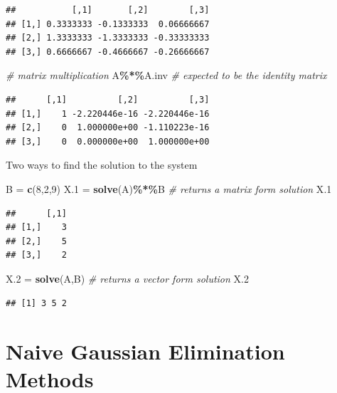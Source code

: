 \documentclass[
]{book}
\newenvironment{Shaded}{\begin{snugshade}}{\end{snugshade}}
\newcommand{\CommentTok}[1]{\textcolor[rgb]{0.56,0.35,0.01}{\textit{#1}}}
\newcommand{\DecValTok}[1]{\textcolor[rgb]{0.00,0.00,0.81}{#1}}
\newcommand{\FloatTok}[1]{\textcolor[rgb]{0.00,0.00,0.81}{#1}}
\newcommand{\FunctionTok}[1]{\textcolor[rgb]{0.13,0.29,0.53}{\textbf{#1}}}
\newcommand{\NormalTok}[1]{#1}
\newcommand{\OtherTok}[1]{\textcolor[rgb]{0.56,0.35,0.01}{#1}}
\newcommand{\SpecialCharTok}[1]{\textcolor[rgb]{0.81,0.36,0.00}{\textbf{#1}}}
\begin{document}
\begin{verbatim}
##           [,1]       [,2]        [,3]
## [1,] 0.3333333 -0.1333333  0.06666667
## [2,] 1.3333333 -1.3333333 -0.33333333
## [3,] 0.6666667 -0.4666667 -0.26666667
\end{verbatim}

\begin{Shaded}
\begin{Highlighting}[]
\CommentTok{\# matrix multiplication}
\NormalTok{A}\SpecialCharTok{\%*\%}\NormalTok{A.inv    }\CommentTok{\# expected to be the identity matrix}
\end{Highlighting}
\end{Shaded}

\begin{verbatim}
##      [,1]          [,2]          [,3]
## [1,]    1 -2.220446e-16 -2.220446e-16
## [2,]    0  1.000000e+00 -1.110223e-16
## [3,]    0  0.000000e+00  1.000000e+00
\end{verbatim}

Two ways to find the solution to the system

\begin{Shaded}
\begin{Highlighting}[]
\NormalTok{B }\OtherTok{=} \FunctionTok{c}\NormalTok{(}\DecValTok{8}\NormalTok{,}\DecValTok{2}\NormalTok{,}\DecValTok{9}\NormalTok{)}
\NormalTok{X}\FloatTok{.1} \OtherTok{=} \FunctionTok{solve}\NormalTok{(A)}\SpecialCharTok{\%*\%}\NormalTok{B  }\CommentTok{\# returns a matrix form solution}
\NormalTok{X}\FloatTok{.1}    
\end{Highlighting}
\end{Shaded}

\begin{verbatim}
##      [,1]
## [1,]    3
## [2,]    5
## [3,]    2
\end{verbatim}

\begin{Shaded}
\begin{Highlighting}[]
\NormalTok{X}\FloatTok{.2} \OtherTok{=} \FunctionTok{solve}\NormalTok{(A,B)   }\CommentTok{\# returns a vector form solution}
\NormalTok{X}\FloatTok{.2}
\end{Highlighting}
\end{Shaded}

\begin{verbatim}
## [1] 3 5 2
\end{verbatim}

\hypertarget{naive-gaussian-elimination-methods}{%
\section{Naive Gaussian Elimination Methods}\label{naive-gaussian-elimination-methods}}
\end{document}
